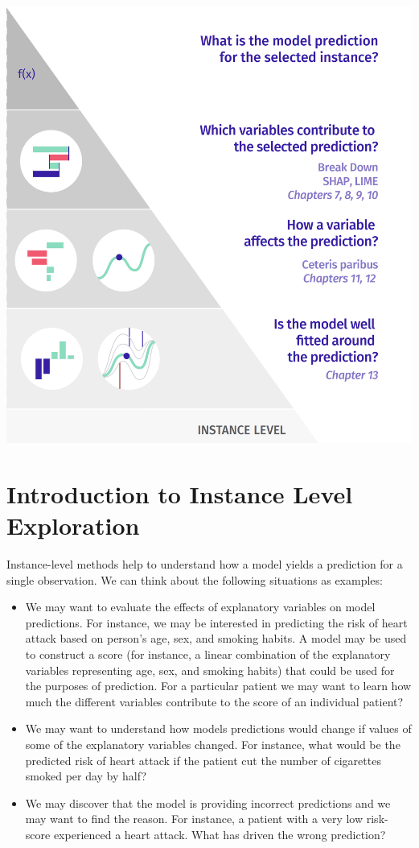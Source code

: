 \documentclass[]{krantz}
\providecommand{\tightlist}{%
  \setlength{\itemsep}{0pt}\setlength{\parskip}{0pt}}
\begin{document}
\begin{center}\includegraphics[width=0.99\linewidth]{figure/UMEPpiramideInstance} \end{center}

\hypertarget{InstanceLevelExploration}{%
\chapter{Introduction to Instance Level Exploration}\label{InstanceLevelExploration}}

Instance-level methods help to understand how a model yields a prediction for a single observation. We can think about the following situations as examples:

\begin{itemize}
\tightlist
\item
  We may want to evaluate the effects of explanatory variables on model predictions. For instance, we may be interested in predicting the risk of heart attack based on person's age, sex, and smoking habits. A model may be used to construct a score (for instance, a linear combination of the explanatory variables representing age, sex, and smoking habits) that could be used for the purposes of prediction. For a particular patient we may want to learn how much the different variables contribute to the score of an individual patient?
\item
  We may want to understand how models predictions would change if values of some of the explanatory variables changed. For instance, what would be the predicted risk of heart attack if the patient cut the number of cigarettes smoked per day by half?
\item
  We may discover that the model is providing incorrect predictions and we may want to find the reason. For instance, a patient with a very low risk-score experienced a heart attack. What has driven the wrong prediction?
\end{itemize}
\end{document}
